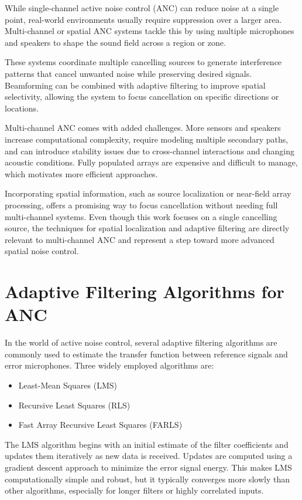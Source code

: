 While single-channel active noise control (ANC) can reduce noise at a single point, real-world environments usually require suppression over a larger area. Multi-channel or spatial ANC systems tackle this by using multiple microphones and speakers to shape the sound field across a region or zone.

These systems coordinate multiple cancelling sources to generate interference patterns that cancel unwanted noise while preserving desired signals. Beamforming can be combined with adaptive filtering to improve spatial selectivity, allowing the system to focus cancellation on specific directions or locations.

Multi-channel ANC comes with added challenges. More sensors and speakers increase computational complexity, require modeling multiple secondary paths, and can introduce stability issues due to cross-channel interactions and changing acoustic conditions. Fully populated arrays are expensive and difficult to manage, which motivates more efficient approaches.

Incorporating spatial information, such as source localization or near-field array processing, offers a promising way to focus cancellation without needing full multi-channel systems. Even though this work focuses on a single cancelling source, the techniques for spatial localization and adaptive filtering are directly relevant to multi-channel ANC and represent a step toward more advanced spatial noise control\cite{Ear_field_ANC}\cite{Applied_ANC}.

\section{Adaptive Filtering Algorithms for ANC}

In the world of active noise control, several adaptive filtering algorithms are commonly used to estimate the transfer function between reference signals and error microphones. Three widely employed algorithms are:

\begin{itemize}
    \item Least-Mean Squares (LMS)
    \item Recursive Least Squares (RLS)
    \item Fast Array Recursive Least Squares (FARLS)
\end{itemize}

The LMS algorithm begins with an initial estimate of the filter coefficients and updates them iteratively as new data is received. Updates are computed using a gradient descent approach to minimize the error signal energy. This makes LMS computationally simple and robust, but it typically converges more slowly than other algorithms, especially for longer filters or highly correlated inputs.


